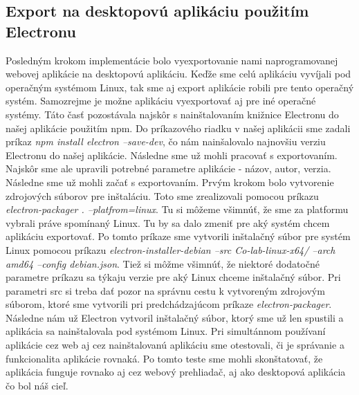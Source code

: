 \subsection{Export na desktopovú aplikáciu použitím Electronu}
\indent Posledným krokom implementácie bolo vyexportovanie nami naprogramovanej webovej aplikácie na desktopovú aplikáciu. Keďže sme celú aplikáciu vyvíjali pod operačným systémom Linux, tak sme aj export aplikácie robili pre tento operačný systém. Samozrejme je možne aplikáciu vyexportovať aj pre iné operačné systémy. Táto časť pozostávala najskôr s nainštalovaním knižnice Electronu do našej aplikácie použitím npm. Do príkazového riadku v našej aplikácii sme zadali príkaz \textit{npm install electron --save-dev}, čo nám nainšalovalo najnovšiu verziu Electronu do našej aplikácie. Následne sme už mohli pracovať s exportovaním. Najskôr sme ale upravili potrebné parametre aplikácie - názov, autor, verzia. Následne sme už mohli začať s exportovaním. Prvým krokom bolo vytvorenie zdrojových súborov pre inštaláciu. Toto sme zrealizovali pomocou príkazu \textit{electron-packager . --platfrom=linux}. Tu si môžeme všimnúť, že sme za platformu vybrali práve spomínaný Linux. Tu by sa dalo zmeniť pre aký systém chcem aplikáciu exportovať. Po tomto príkaze sme vytvorili inštalačný súbor pre systém Linux pomocou príkazu \textit{electron-installer-debian --src Co-lab-linux-x64/ --arch amd64 --config debian.json}. Tiež si môžme všimnúť, že niektoré dodatočné parametre príkazu sa týkaju verzie pre aký Linux chceme inštalačný súbor. Pri parametri src si treba dať pozor na správnu cestu k vytvoreným zdrojovým súborom, ktoré sme vytvorili pri predchádzajúcom príkaze \textit{electron-packager}. Následne nám už Electron vytvoril inštalačný súbor, ktorý sme už len spustili a aplikácia sa nainštalovala pod systémom Linux. Pri simultánnom používaní aplikácie cez web aj cez nainštalovanú aplikáciu sme otestovali, či je správanie a funkcionalita aplikácie rovnaká. Po tomto teste sme mohli skonštatovať, že aplikácia funguje rovnako aj cez webový prehliadač, aj ako desktopová aplikácia čo bol náš cieľ.